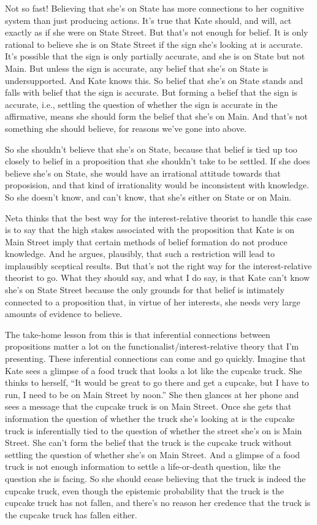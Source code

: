 Not so fast! Believing that she's on State has more connections to her cognitive system than just producing actions. It's true that Kate should, and will, act exactly as if she were on State Street. But that's not enough for belief. It is only rational to believe she is on State Street if the sign she's looking at is accurate. It's possible that the sign is only partially accurate, and she is on State but not Main. But unless the sign is accurate, any belief that she's on State is undersupported. And Kate knows this. So belief that she's on State stands and falls with belief that the sign is accurate. But forming a belief that the sign is accurate, i.e., settling the question of whether the sign is accurate in the affirmative, means she should form the belief that she's on Main. And that's not something she should believe, for reasons we've gone into above.

So she shouldn't believe that she's on State, because that belief is tied up too closely to belief in a proposition that she shouldn't take to be settled. If she does believe she's on State, she would have an irrational attitude towards that proposision, and that kind of irrationality would be inconsistent with knowledge. So she doesn't know, and can't know, that she's either on State or on Main.

Neta thinks that the best way for the interest-relative theorist to handle this case is to say that the high stakes associated with the proposition that Kate is on Main Street imply that certain methods of belief formation do not produce knowledge. And he argues, plausibly, that such a restriction will lead to implausibly sceptical results. But that's not the right way for the interest-relative theorist to go. What they should say, and what I do say, is that Kate can't know she's on State Street because the only grounds for that belief is intimately connected to a proposition that, in virtue of her interests, she needs very large amounts of evidence to believe.

The take-home lesson from this is that inferential connections between propositions matter a lot on the functionalist/interest-relative theory that I'm presenting. These inferential connections can come and go quickly. Imagine that Kate sees a glimpse of a food truck that looks a lot like the cupcake truck. She thinks to herself, ``It would be great to go there and get a cupcake, but I have to run, I need to be on Main Street by noon.'' She then glances at her phone and sees a message that the cupcake truck is on Main Street. Once she gets that information the question of whether the truck she's looking at is the cupcake truck is inferentially tied to the question of whether the street she's on is Main Street. She can't form the belief that the truck is the cupcake truck without settling the question of whether she's on Main Street. And a glimpse of a food truck is not enough information to settle a life-or-death question, like the question she is facing. So she should cease believing that the truck is indeed the cupcake truck, even though the epistemic probability that the truck is the cupcake truck has not fallen, and there's no reason her credence that the truck is the cupcake truck has fallen either.

